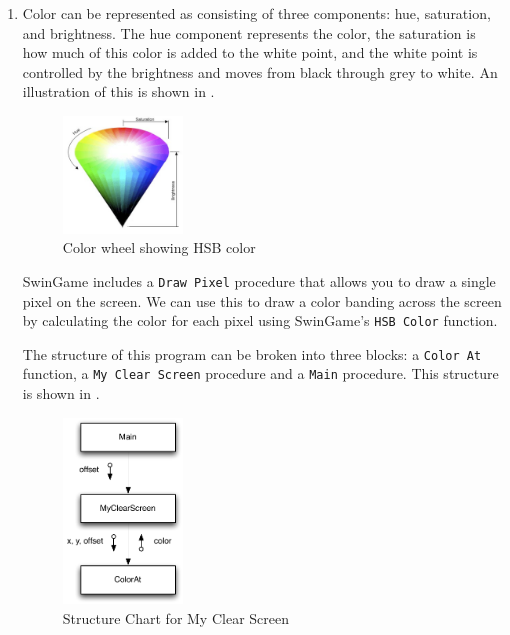 \begin{enumerate}
  \item Color can be represented as consisting of three components: hue, saturation, and brightness. The hue component represents the color, the saturation is how much of this color is added to the white point, and the white point is controlled by the brightness and moves from black through grey to white. An illustration of this is shown in .

\begin{figure}[htbp]
   \centering
   \includegraphics[width=0.3\textwidth]{./topics/control-flow/exercises/Color.png} 
   \caption{Color wheel showing HSB color}
   \label{fig:color_wheel}
\end{figure}

  SwinGame includes a \texttt{Draw Pixel} procedure that allows you to draw a single pixel on the screen. We can use this to draw a color banding across the screen by calculating the color for each pixel using SwinGame's \texttt{HSB Color} function.
  
  The structure of this program can be broken into three blocks: a \texttt{Color At} function, a \texttt{My Clear Screen} procedure and a \texttt{Main} procedure. This structure is shown in .

  \begin{figure}[htbp]
     \centering
     \includegraphics[width=0.3\textwidth]{./topics/control-flow/exercises/MyClearScreen.pdf} 
     \caption{Structure Chart for My Clear Screen}
     \label{fig:my_clear_screen}
  \end{figure}


\end{enumerate}

